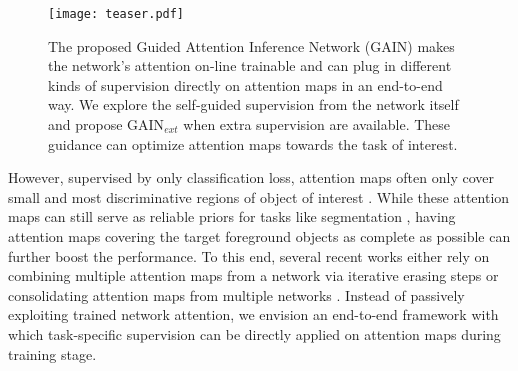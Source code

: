 \documentclass[10pt,twocolumn,letterpaper]{article}
\begin{document}

 \begin{figure}%
 \centering
 \texttt{[image: teaser.pdf]} %
 \caption{The proposed Guided Attention Inference Network (GAIN) makes the network's attention on-line trainable and can plug in different kinds of supervision directly on attention maps in an end-to-end way. We explore the self-guided supervision from the network itself and propose GAIN$_{ext}$ when extra supervision are available. These guidance can optimize attention maps towards the task of interest.}
 \label{fig:teaser} 
 \end{figure} 

However, supervised by only classification loss, attention maps often only cover small and most discriminative regions of object of interest \cite{kim2017two,singh2017hide,zhou2016learning}. While these attention maps can still serve as reliable priors for tasks like segmentation \cite{kolesnikov2016seed}, having attention maps covering the target foreground objects as complete as possible can further boost the performance. To this end, several recent works either rely on  combining multiple attention maps from a network via iterative erasing steps \cite{wei2017object} or consolidating attention maps from multiple networks \cite{kim2017two}. Instead of passively exploiting trained network attention, we envision an end-to-end framework with which task-specific supervision can be directly applied on attention maps during training stage.

\end{document}
